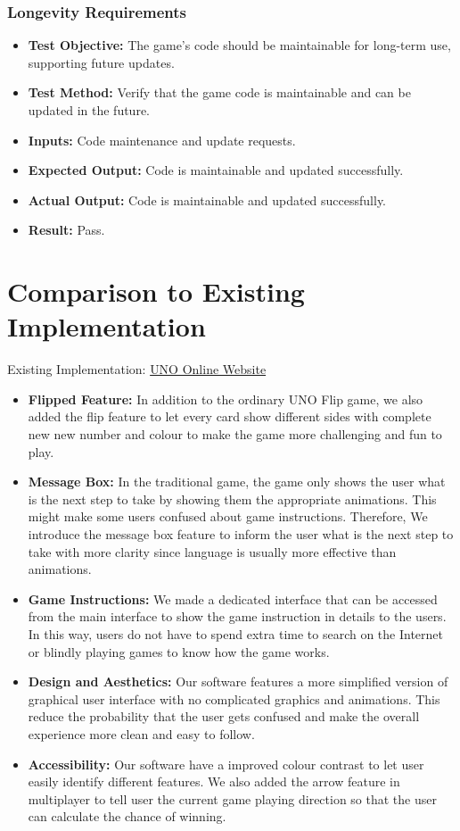 \documentclass[12pt, titlepage]{article}
\begin{document}
\subsubsection{Longevity Requirements}
\begin{itemize}
    \item \textbf{Test Objective:} The game’s code should be maintainable for long-term use, supporting future updates.
    \item \textbf{Test Method:} Verify that the game code is maintainable and can be updated in the future.
    \item \textbf{Inputs:} Code maintenance and update requests.
    \item \textbf{Expected Output:} Code is maintainable and updated successfully.
    \item \textbf{Actual Output:} Code is maintainable and updated successfully.
    \item \textbf{Result:} Pass.
\end{itemize}





\section{Comparison to Existing Implementation}
Existing Implementation: \href{https://unoonline.io/}{UNO Online Website}
\begin{itemize}
    \item \textbf{Flipped Feature:}
    In addition to the ordinary UNO Flip game, we also added the flip feature to let every card show different sides with complete new new number and colour to make the game more challenging and fun to play.
    \item \textbf{Message Box:} In the traditional game, the game only shows the user what is the next step to take by showing them the appropriate animations. This might make some users confused about game instructions. Therefore, We introduce the message box feature to inform the user what is the next step to take with more clarity since language is usually more effective than animations.
    \item \textbf{Game Instructions:} We made a dedicated interface that can be accessed from the main interface to show the game instruction in details to the users. In this way, users do not have to spend extra time to search on the Internet or blindly playing games to know how the game works.
    \item \textbf{Design and Aesthetics:} Our software features a more simplified version of graphical user interface with no complicated graphics and animations. This reduce the probability that the user gets confused and make the overall experience more clean and easy to follow.
    \item \textbf{Accessibility:} Our software have a improved colour contrast to let user easily identify different features. We also added the arrow feature in multiplayer to tell user the current game playing direction so that the user can calculate the chance of winning. 
\end{itemize}
\end{document}
